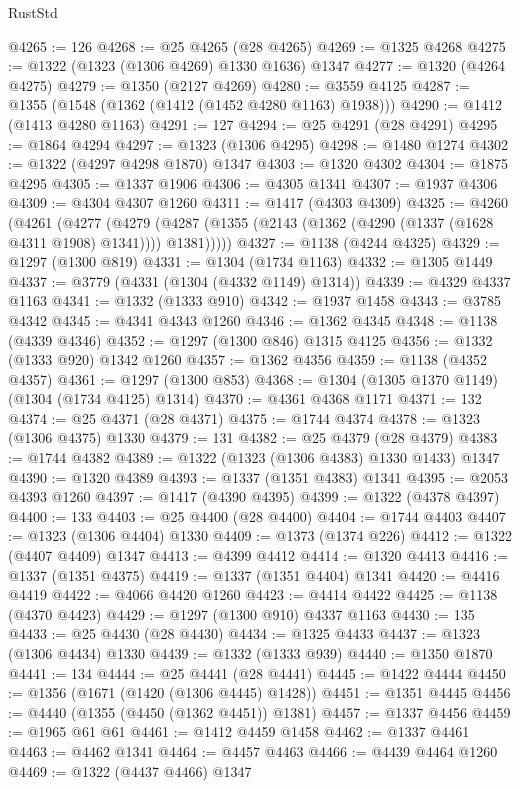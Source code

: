 \begin{lexlean}{RustStd}
\begin{coremodule}
{\begin{coremodule}
{{{{{{{{{{{{{{{{{{{{{{{{{{{{{{{{{{@4265 := 126
@4268 := @25 @4265 (@28 @4265)
@4269 := @1325 @4268
@4275 := @1322 (@1323 (@1306 @4269) @1330 @1636) @1347
@4277 := @1320 (@4264 @4275)
@4279 := @1350 (@2127 @4269)
@4280 := @3559 @4125
@4287 := @1355 (@1548 (@1362 (@1412 (@1452 @4280 @1163) @1938)))
@4290 := @1412 (@1413 @4280 @1163)
@4291 := 127
@4294 := @25 @4291 (@28 @4291)
@4295 := @1864 @4294
@4297 := @1323 (@1306 @4295)
@4298 := @1480 @1274
@4302 := @1322 (@4297 @4298 @1870) @1347
@4303 := @1320 @4302
@4304 := @1875 @4295
@4305 := @1337 @1906
@4306 := @4305 @1341
@4307 := @1937 @4306
@4309 := @4304 @4307 @1260
@4311 := @1417 (@4303 @4309)
@4325 := @4260
    (@4261
      (@4277
        (@4279 (@4287 (@1355 (@2143 (@1362 (@4290 (@1337 (@1628 @4311 @1908) @1341)))) @1381)))))
@4327 := @1138 (@4244 @4325)
@4329 := @1297 (@1300 @819)
@4331 := @1304 (@1734 @1163)
@4332 := @1305 @1449
@4337 := @3779 (@4331 (@1304 (@4332 @1149) @1314))
@4339 := @4329 @4337 @1163
@4341 := @1332 (@1333 @910)
@4342 := @1937 @1458
@4343 := @3785 @4342
@4345 := @4341 @4343 @1260
@4346 := @1362 @4345
@4348 := @1138 (@4339 @4346)
@4352 := @1297 (@1300 @846) @1315 @4125
@4356 := @1332 (@1333 @920) @1342 @1260
@4357 := @1362 @4356
@4359 := @1138 (@4352 @4357)
@4361 := @1297 (@1300 @853)
@4368 := @1304 (@1305 @1370 @1149) (@1304 (@1734 @4125) @1314)
@4370 := @4361 @4368 @1171
@4371 := 132
@4374 := @25 @4371 (@28 @4371)
@4375 := @1744 @4374
@4378 := @1323 (@1306 @4375) @1330
@4379 := 131
@4382 := @25 @4379 (@28 @4379)
@4383 := @1744 @4382
@4389 := @1322 (@1323 (@1306 @4383) @1330 @1433) @1347
@4390 := @1320 @4389
@4393 := @1337 (@1351 @4383) @1341
@4395 := @2053 @4393 @1260
@4397 := @1417 (@4390 @4395)
@4399 := @1322 (@4378 @4397)
@4400 := 133
@4403 := @25 @4400 (@28 @4400)
@4404 := @1744 @4403
@4407 := @1323 (@1306 @4404) @1330
@4409 := @1373 (@1374 @226)
@4412 := @1322 (@4407 @4409) @1347
@4413 := @4399 @4412
@4414 := @1320 @4413
@4416 := @1337 (@1351 @4375)
@4419 := @1337 (@1351 @4404) @1341
@4420 := @4416 @4419
@4422 := @4066 @4420 @1260
@4423 := @4414 @4422
@4425 := @1138 (@4370 @4423)
@4429 := @1297 (@1300 @910) @4337 @1163
@4430 := 135
@4433 := @25 @4430 (@28 @4430)
@4434 := @1325 @4433
@4437 := @1323 (@1306 @4434) @1330
@4439 := @1332 (@1333 @939)
@4440 := @1350 @1870
@4441 := 134
@4444 := @25 @4441 (@28 @4441)
@4445 := @1422 @4444
@4450 := @1356 (@1671 (@1420 (@1306 @4445) @1428))
@4451 := @1351 @4445
@4456 := @4440 (@1355 (@4450 (@1362 @4451)) @1381)
@4457 := @1337 @4456
@4459 := @1965 @61 @61
@4461 := @1412 @4459 @1458
@4462 := @1337 @4461
@4463 := @4462 @1341
@4464 := @4457 @4463
@4466 := @4439 @4464 @1260
@4469 := @1322 (@4437 @4466) @1347
}}}}}}}}}}}}}}}}}}}}}}}}}}}}}}}}}}
\end{coremodule}}
\end{coremodule}
\end{lexlean}
